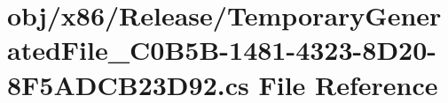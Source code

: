 \hypertarget{TemporaryGeneratedFile__036C0B5B-1481-4323-8D20-8F5ADCB23D92_8cs}{\section{obj/x86/\-Release/\-Temporary\-Generated\-File\-\_\-C0\-B5\-B-\/1481-\/4323-\/8\-D20-\/8\-F5\-A\-D\-C\-B23\-D92.cs File Reference}
\label{TemporaryGeneratedFile__036C0B5B-1481-4323-8D20-8F5ADCB23D92_8cs}
}
